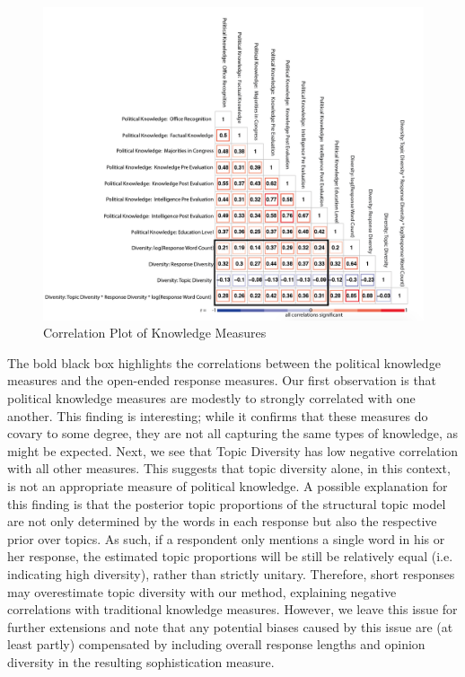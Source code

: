 \documentclass[12pt]{article}
\begin{document}
\begin{figure}[h]
\includegraphics[width=\textwidth]{../fig/corr_fixed_data.png}
\caption{Correlation Plot of Knowledge Measures}\label{fig:corr}
\end{figure}

The bold black box highlights the correlations between the political knowledge measures and the open-ended response measures.  Our first observation is that political knowledge measures are modestly to strongly correlated with one another.  This finding is interesting; while it confirms that these measures do covary to some degree, they are not all capturing the same types of knowledge, as might be expected.  Next, we see that Topic Diversity has low negative correlation with all other measures.  This suggests that topic diversity alone, in this context, is not an appropriate measure of political knowledge.  A possible explanation for this finding is that the posterior topic proportions of the structural topic model are not only determined by the words in each response but also the respective prior over topics. As such, if a respondent only mentions a single word in his or her response, the estimated topic proportions will be still be relatively equal (i.e. indicating high diversity), rather than strictly unitary. Therefore, short responses may overestimate topic diversity with our method, explaining negative correlations with traditional knowledge measures. However, we leave this issue for further extensions and note that any potential biases caused by this issue are (at least partly) compensated by including overall response lengths and opinion diversity in the resulting sophistication measure.
\end{document}
